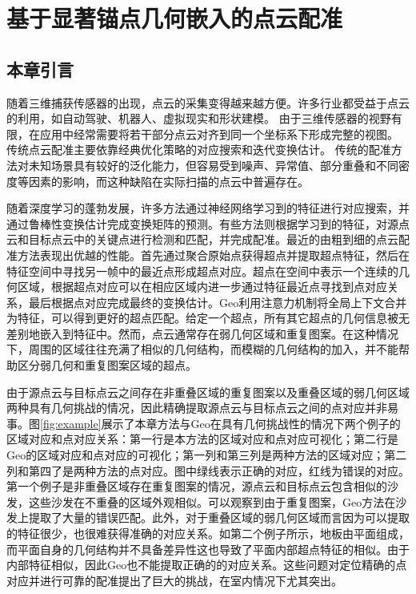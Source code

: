 \chapter{基于显著锚点几何嵌入的点云配准}
\thispagestyle{others}
\pagestyle{others}
\xiaosi

    \section{本章引言}
    随着三维捕获传感器的出现，点云的采集变得越来越方便。许多行业都受益于点云的利用，如自动驾驶、机器人、虚拟现实和形状建模。
    由于三维传感器的视野有限，在应用中经常需要将若干部分点云对齐到同一个坐标系下形成完整的视图。
    传统点云配准主要依靠经典优化策略的对应搜索和迭代变换估计。
    传统的配准方法对未知场景具有较好的泛化能力，但容易受到噪声、异常值、部分重叠和不同密度等因素的影响，而这种缺陷在实际扫描的点云中普遍存在。

    随着深度学习的蓬勃发展，许多方法通过神经网络学习到的特征进行对应搜索，并通过鲁棒性变换估计完成变换矩阵的预测。有些方法则根据学习到的特征，对源点云和目标点云中的关键点进行检测和匹配，并完成配准。最近的由粗到细的点云配准方法表现出优越的性能。首先通过聚合原始点获得超点并提取超点特征，然后在特征空间中寻找另一帧中的最近点形成超点对应。超点在空间中表示一个连续的几何区域，根据超点对应可以在相应区域内进一步通过特征最近点寻找到点对应关系，最后根据点对应完成最终的变换估计。Geo利用注意力机制将全局上下文合并为特征，可以得到更好的超点匹配。给定一个超点，所有其它超点的几何信息被无差别地嵌入到特征中。然而，点云通常存在弱几何区域和重复图案。在这种情况下，周围的区域往往充满了相似的几何结构，而模糊的几何结构的加入，并不能帮助区分弱几何和重复图案区域的超点。

    由于源点云与目标点云之间存在非重叠区域的重复图案以及重叠区域的弱几何区域两种具有几何挑战的情况，因此精确提取源点云与目标点云之间的点对应并非易事。图\ref{fig:example}展示了本章方法与Geo在具有几何挑战性的情况下两个例子的区域对应和点对应关系：第一行是本方法的区域对应和点对应可视化；第二行是Geo的区域对应和点对应的可视化；第一列和第三列是两种方法的区域对应；第二列和第四了是两种方法的点对应。图中绿线表示正确的对应，红线为错误的对应。第一个例子是非重叠区域存在重复图案的情况，源点云和目标点云包含相似的沙发，这些沙发在不重叠的区域外观相似。可以观察到由于重复图案，Geo方法在沙发上提取了大量的错误匹配。此外，对于重叠区域的弱几何区域而言因为可以提取的特征很少，也很难获得准确的对应关系。如第二个例子所示，地板由平面组成，而平面自身的几何结构并不具备差异性这也导致了平面内部超点特征的相似。由于内部特征相似，因此Geo也不能提取正确的的对应关系。这些问题对定位精确的点对应并进行可靠的配准提出了巨大的挑战，在室内情况下尤其突出。

